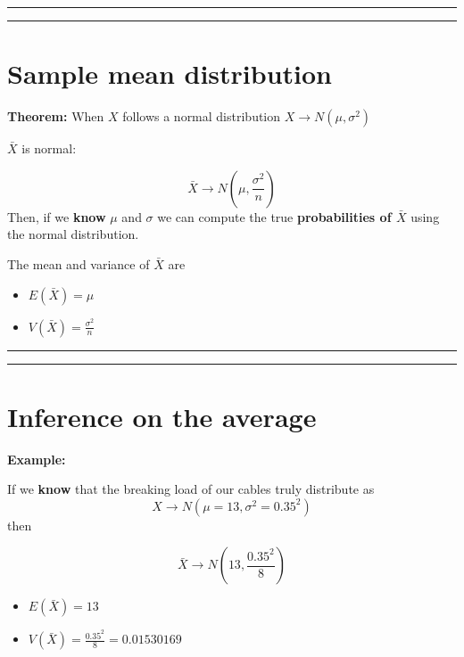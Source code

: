 \documentclass[
]{book}
\providecommand{\tightlist}{%
  \setlength{\itemsep}{0pt}\setlength{\parskip}{0pt}}
\begin{document}
\begin{center}\rule{0.5\linewidth}{0.5pt}\end{center}

\begin{center}\rule{0.5\linewidth}{0.5pt}\end{center}

\hypertarget{sample-mean-distribution}{%
\section{Sample mean distribution}\label{sample-mean-distribution}}

\textbf{Theorem:} When \(X\) follows a normal distribution \(X \rightarrow N(\mu, \sigma^2)\)

\(\bar{X}\) is normal:

\[\bar{X} \rightarrow N(\mu, \frac{\sigma^2}{n})\]
Then, if we \textbf{know} \(\mu\) and \(\sigma\) we can compute the true \textbf{probabilities of \(\bar{X}\)} using the normal distribution.

The mean and variance of \(\bar{X}\) are

\begin{itemize}
\tightlist
\item
  \(E(\bar{X})=\mu\)
\item
  \(V(\bar{X})=\frac{\sigma^2}{n}\)
\end{itemize}

\begin{center}\rule{0.5\linewidth}{0.5pt}\end{center}

\begin{center}\rule{0.5\linewidth}{0.5pt}\end{center}

\hypertarget{inference-on-the-average}{%
\section{Inference on the average}\label{inference-on-the-average}}

\textbf{Example:}

If we \textbf{know} that the breaking load of our cables truly distribute as \[X \rightarrow N(\mu=13, \sigma^2=0.35^2)\] then

\[\bar{X} \rightarrow N(13, \frac{0.35^2}{8})\]

\begin{itemize}
\tightlist
\item
  \(E(\bar{X})=13\)
\item
  \(V(\bar{X})=\frac{0.35^2}{8}=0.01530169\)
\end{itemize}
\end{document}
